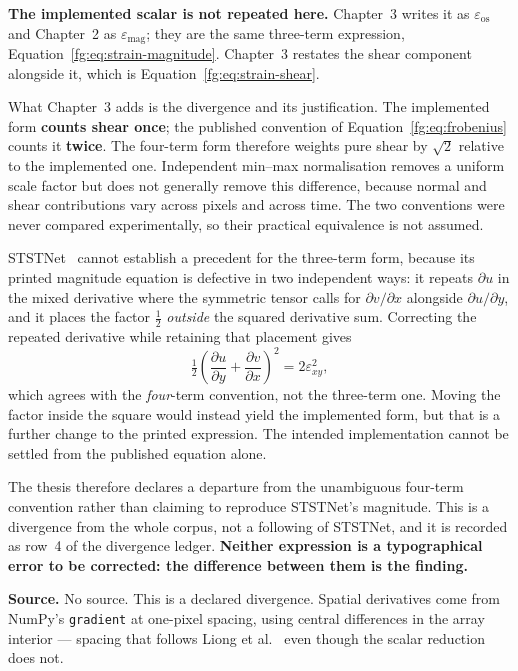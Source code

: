 \documentclass[11pt,a4paper]{article}
\numberwithin{equation}{section}
\begin{document}
\textbf{The implemented scalar is not repeated here.} Chapter~3 writes it as
$\varepsilon_{\mathrm{os}}$ and Chapter~2 as $\varepsilon_{\mathrm{mag}}$;
they are the same three-term expression, Equation~\eqref{fg:eq:strain-magnitude}.
Chapter~3 restates the shear component alongside it, which is
Equation~\eqref{fg:eq:strain-shear}.

What Chapter~3 adds is the divergence and its justification. The implemented
form \textbf{counts shear once}; the published convention of
Equation~\eqref{fg:eq:frobenius} counts it \textbf{twice}. The four-term form
therefore weights pure shear by $\sqrt{2}$ relative to the implemented one.
Independent min--max normalisation removes a uniform scale factor but does not
generally remove this difference, because normal and shear contributions vary
across pixels and across time. The two conventions were never compared
experimentally, so their practical equivalence is not assumed.

STSTNet~\cite{liong2019b} cannot establish a precedent for the three-term
form, because its printed magnitude equation is defective in two independent
ways: it repeats $\partial u$ in the mixed derivative where the symmetric
tensor calls for $\partial v/\partial x$ alongside $\partial u/\partial y$,
and it places the factor $\tfrac{1}{2}$ \emph{outside} the squared derivative
sum. Correcting the repeated derivative while retaining that placement gives
\begin{equation}
    \tfrac{1}{2}
       \left(\frac{\partial u}{\partial y}
            +\frac{\partial v}{\partial x}\right)^2
       =2\varepsilon_{xy}^{2},
    \label{fg:eq:shear-identity}
\end{equation}
which agrees with the \emph{four}-term convention, not the three-term one.
Moving the factor inside the square would instead yield the implemented form,
but that is a further change to the printed expression. The intended
implementation cannot be settled from the published equation alone.

The thesis therefore declares a departure from the unambiguous four-term
convention rather than claiming to reproduce STSTNet's magnitude. This is a
divergence from the whole corpus, not a following of STSTNet, and it is
recorded as row~4 of the divergence ledger. \textbf{Neither expression is a
typographical error to be corrected: the difference between them is the
finding.}

\textbf{Source.} No source. This is a declared divergence. Spatial
derivatives come from NumPy's \texttt{gradient} at one-pixel spacing, using
central differences in the array interior --- spacing that follows Liong et
al.~\cite{liong2014a} even though the scalar reduction does not.
\end{document}
